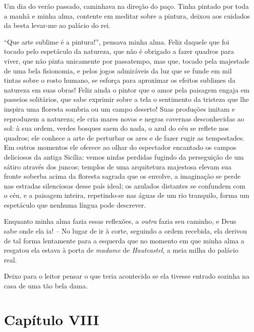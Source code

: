  Um dia do verão passado, caminhava na direção do paço. Tinha pintado
por toda a manhã e minha alma, contente em meditar sobre a pintura,
deixou aos cuidados da besta levar-me ao palácio do rei.

 ``Que arte sublime é a pintura!'', pensava minha alma. Feliz daquele que
foi tocado pelo espetáculo da natureza, que não é obrigado a fazer
quadros para viver, que não pinta unicamente por passatempo, mas que,
tocado pela majestade de uma bela fisionomia, e pelos jogos admiráveis
da luz que se funde em mil tintas sobre o rosto humano, se esforça para
aproximar os efeitos sublimes da natureza em suas obras! Feliz ainda o
pintor que o amor pela paisagem engaja em passeios solitários, que sabe
exprimir sobre a tela o sentimento da tristeza que lhe inspira uma
floresta sombria ou um campo deserto! Suas produções imitam e
reproduzem a natureza; ele cria mares novos e negras cavernas
desconhecidas ao sol: à sua ordem, verdes bosques saem do nada, o azul
do céu se reflete nos quadros; ele conhece a arte de perturbar os ares
e de fazer rugir as tempestades. Em outros momentos ele oferece ao
olhar do espectador encantado os campos deliciosos da antiga Sicília:
vemos ninfas perdidas fugindo da perseguição de um sátiro através dos
juncos; templos de uma arquitetura majestosa elevam sua fronte soberba
acima da floresta sagrada que os envolve, a imaginação se perde nas
estradas silenciosas desse país ideal; os azulados distantes se
confundem com o céu, e a paisagem inteira, repetindo-se nas águas de um
rio tranquilo, forma um espetáculo que nenhuma língua pode descrever.

 Enquanto minha alma fazia essas reflexões, a \textit{outra} fazia seu
caminho, e Deus sabe onde ela ia! -- No lugar de ir à corte, seguindo
a ordem recebida, ela derivou de tal forma lentamente para a esquerda
que no momento em que minha alma a resgatou ela estava à porta de
\textit{madame} de \textit{Hautcastel}, a meia milha do palácio real.

 Deixo para o leitor pensar o que teria acontecido se ela tivesse
entrado sozinha na casa de uma tão bela dama. 

\section*{Capítulo VIII}

